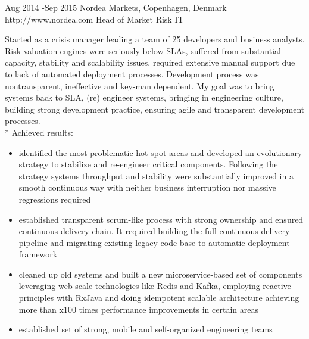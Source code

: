\documentclass[10pt]{article} %
\begin{document}

        \job
        {Aug 2014 -}{Sep 2015}
        {Nordea Markets, Copenhagen, Denmark}
        {http://www.nordea.com}
        {Head of Market Risk IT}
        {Started as a crisis manager leading a team of 25 developers and business analysts.
        Risk valuation engines were seriously below SLAs, suffered from substantial capacity, stability and scalability issues, required extensive manual support due to lack of automated deployment processes. Development process was nontransparent, ineffective and key-man dependent.
        My goal was to bring systems back to SLA, (re) engineer  systems, bringing in
        engineering culture, building strong development practice, ensuring agile and transparent development
        processes.\\*
        Achieved results:
        \begin{itemize}
            \item{identified the most problematic hot spot areas and developed an evolutionary strategy to stabilize and re-engineer critical
                components. Following the strategy systems throughput and stability were substantially improved
                in a smooth continuous way with neither business interruption nor massive regressions required}
            \item{established transparent scrum-like process with strong ownership and ensured continuous delivery chain.
                It required building the full continuous delivery pipeline and migrating existing legacy code base to
                automatic deployment framework}
            \item{cleaned up old systems and built a new microservice-based set of components leveraging web-scale
                technologies like Redis and Kafka, employing reactive principles with RxJava and doing idempotent scalable
                architecture achieving more than x100 times performance improvements in certain areas}
            \item{established set of strong, mobile and self-organized engineering teams}
        \end{itemize}
        }
\end{document}
